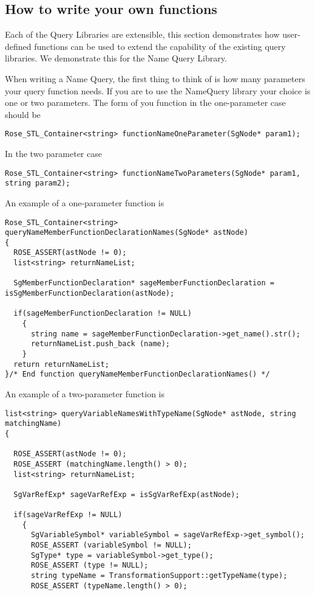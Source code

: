 {\subsection{How to write your own functions}

Each of the Query Libraries are extensible, this section demonstrates
how user-defined functions can be used to extend the capability of the
existing query libraries.  We demonstrate this for the Name Query Library.

When writing a Name Query, the first thing to think of is how many
parameters your query function needs. If you are to use the NameQuery
library your choice is one or two parameters. The form of you function
in the one-parameter case should be
\begin{verbatim}
Rose_STL_Container<string> functionNameOneParameter(SgNode* param1);
\end{verbatim}
In the two parameter case
\begin{verbatim}
Rose_STL_Container<string> functionNameTwoParameters(SgNode* param1, string param2);
\end{verbatim}
An example of a one-parameter function is
\begin{verbatim}
Rose_STL_Container<string> queryNameMemberFunctionDeclarationNames(SgNode* astNode)
{
  ROSE_ASSERT(astNode != 0);
  list<string> returnNameList;

  SgMemberFunctionDeclaration* sageMemberFunctionDeclaration = isSgMemberFunctionDeclaration(astNode);

  if(sageMemberFunctionDeclaration != NULL)
    {
      string name = sageMemberFunctionDeclaration->get_name().str();
      returnNameList.push_back (name);
    }
  return returnNameList;
}/* End function queryNameMemberFunctionDeclarationNames() */

\end{verbatim}
An example of a two-parameter function is
\begin{verbatim}
list<string> queryVariableNamesWithTypeName(SgNode* astNode, string matchingName)
{

  ROSE_ASSERT(astNode != 0);
  ROSE_ASSERT (matchingName.length() > 0);
  list<string> returnNameList;

  SgVarRefExp* sageVarRefExp = isSgVarRefExp(astNode);

  if(sageVarRefExp != NULL)
    {
      SgVariableSymbol* variableSymbol = sageVarRefExp->get_symbol();
      ROSE_ASSERT (variableSymbol != NULL);
      SgType* type = variableSymbol->get_type();
      ROSE_ASSERT (type != NULL);
      string typeName = TransformationSupport::getTypeName(type);
      ROSE_ASSERT (typeName.length() > 0);


\end{verbatim}}
